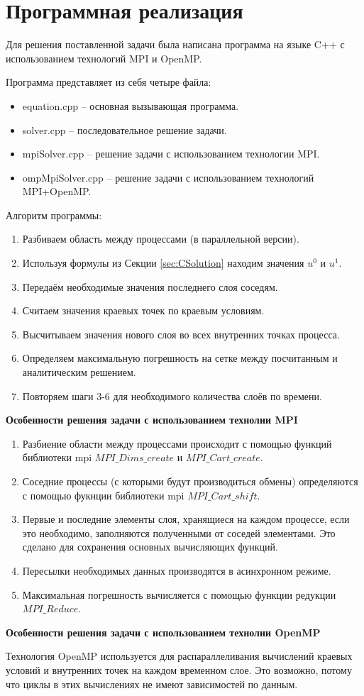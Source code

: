 \section{Программная реализация}
\label{sec:Program} 

Для решения поставленной задачи была написана программа на языке C++ с использованием технологий MPI и OpenMP.

Программа представляет из себя четыре файла:
\begin{itemize}
    \item equation.cpp -- основная вызывающая программа.
    \item solver.cpp -- последовательное решение задачи.
    \item mpiSolver.cpp -- решение задачи с использованием технологии MPI.
    \item ompMpiSolver.cpp -- решение задачи с использованием технологий MPI+OpenMP.
\end{itemize}

Алгоритм программы:
\begin{enumerate}
    \item Разбиваем область между процессами (в параллельной версии).
    \item Используя формулы из Секции \ref{sec:CSolution} находим значения $u^0$ и $u^1$.
    \item Передаём необходимые значения последнего слоя соседям.
    \item Считаем значения краевых точек по краевым условиям.
    \item Высчитываем значения нового слоя во всех внутренних точках процесса.
    \item Определяем максимальную погрешность на сетке между посчитанным и аналитическим решением.
    \item Повторяем шаги 3-6 для необходимого количества слоёв по времени.
\end{enumerate}

\textbf{Особенности решения задачи с использованием технолии MPI}

\begin{enumerate}
    \item Разбиение области между процессами происходит с помощью функций библиотеки mpi $MPI\_Dims\_create$ и $MPI\_Cart\_create$.
    \item Соседние процессы (с которыми будут производиться обмены) определяются с помощью фукнции библиотеки mpi $MPI\_Cart\_shift$.
    \item Первые и последние элементы слоя, хранящиеся на каждом процессе, если это необходимо, заполняются полученными от соседей элементами.
            Это сделано для сохранения основных вычисляющих функций.
    \item Пересылки необходимых данных производятся в асинхронном режиме.
    \item Максимальная погрешность вычисляется с помощью функции редукции $MPI\_Reduce$.
\end{enumerate}

\textbf{Особенности решения задачи с использованием технолии OpenMP}

Технология OpenMP используется для распараллеливания вычислений краевых условий и внутренних точек на каждом временном слое.
Это возможно, потому что циклы в этих вычислениях не имеют зависимостей по данным. 

